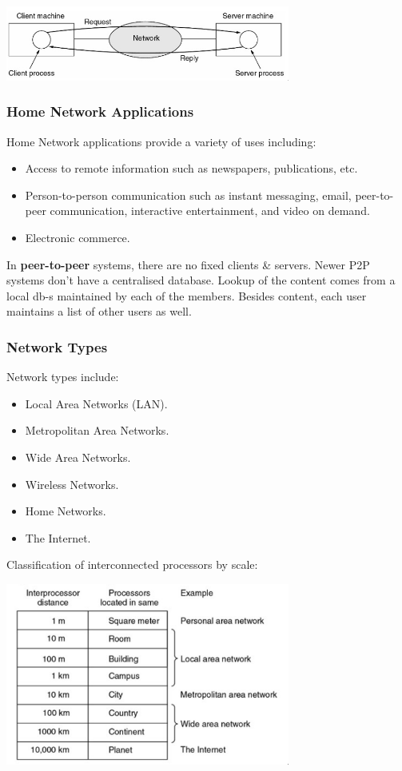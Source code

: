 \documentclass[11pt]{article}
\begin{document}
\begin{center}
    \includegraphics[width=0.7\textwidth]{client-server-diagram.png}
\end{center}

\subsubsection{Home Network Applications}
Home Network applications provide a variety of uses including:
\begin{itemize}
    \item Access to remote information such as newspapers, publications, etc. 
    \item Person-to-person communication such as instant messaging, email, peer-to-peer communication, interactive entertainment, and video on demand. 
    \item Electronic commerce. 
\end{itemize} 

In \textbf{peer-to-peer} systems, there are no fixed clients \& servers. 
Newer P2P systems don't have a centralised database. 
Lookup of the content comes from a local db-s maintained by each of the members. 
Besides content, each user maintains a list of other users as well. 

\subsubsection{Network Types}
Network types include:
\begin{itemize}
    \item Local Area Networks (LAN). 
    \item Metropolitan Area Networks. 
    \item Wide Area Networks. 
    \item Wireless Networks. 
    \item Home Networks. 
    \item The Internet. 
\end{itemize} 

Classification of interconnected processors by scale: 
\begin{center}
    \includegraphics[width=0.7\textwidth]{interconnected-processors-by-scale.png}
\end{center}
\end{document}

